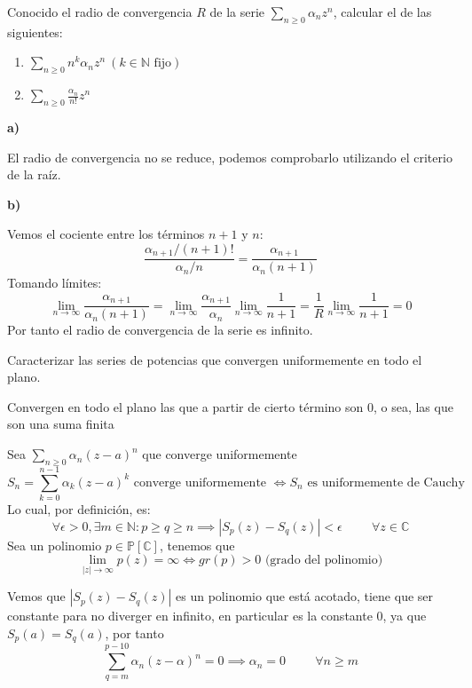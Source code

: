 \begin{ejer}
	Conocido el radio de convergencia $R$ de la serie $\sum_{n\geq 0} \alpha_nz^n$, calcular el de las siguientes:
	\begin{enumerate}[label=(\alph*)]
		\item $\sum_{n\geq 0} n^k\alpha_nz^n \ (k\in\mathbb{N} \text{ fijo})$
		\item $\sum_{n\geq0} \frac{\alpha_n}{n!}z^n$	
	\end{enumerate}
\end{ejer}
\begin{sol}

\textbf{a)}

El radio de convergencia no se reduce, podemos comprobarlo utilizando el criterio de la raíz.

\textbf{b)}

Vemos el cociente entre los términos $n+1$ y $n$:
$$ \frac{\alpha_{n+1}/(n+1)!}{\alpha_n/n} = \frac{\alpha_{n+1}}{\alpha_n (n+1)}$$
Tomando límites:
$$ \lim_{n\rightarrow\infty} \frac{\alpha_{n+1}}{\alpha_n (n+1)} = \lim_{n\rightarrow\infty}\frac{\alpha_{n+1}}{\alpha_n}\lim_{n\rightarrow\infty}\frac{1}{n+1} = \frac{1}{R} \lim_{n\rightarrow\infty}\frac{1}{n+1} = 0$$
Por tanto el radio de convergencia de la serie es infinito.
\end{sol}

\begin{ejer}
	Caracterizar las series de potencias que convergen uniformemente en todo el plano.
\end{ejer}
\begin{sol}

Convergen en todo el plano las que a partir de cierto término son 0, o sea, las que son una suma finita

Sea $\sum_{n\geq 0} \alpha_n (z-a)^n$ que converge uniformemente
$$S_n=\sum_{k=0}^{n-1} \alpha_k (z-a)^k \text{ \ converge uniformemente } \Longleftrightarrow S_n \text{ es uniformemente de Cauchy }$$
Lo cual, por definición, es:
$$\forall\epsilon>0,\exists m\in\mathbb{N}: p\geq q\geq n \implies |S_p(z)-S_q(z)| < \epsilon \hspace{1cm}\forall z\in\mathbb{C}$$
Sea un polinomio $p\in\mathbb{P}[\mathbb{C}]$, tenemos que $$\lim_{|z|\rightarrow\infty} p(z) = \infty \Longleftrightarrow gr(p)>0 \text{ (grado del polinomio)}$$

Vemos que $|S_p(z)-S_q(z)|$ es un polinomio que está acotado, tiene que ser constante para no diverger en infinito, en particular es la constante $0$, ya que $S_p(a)=S_q(a)$, por tanto $$\sum_{q=m}^{p-10} \alpha_n (z-\alpha)^n = 0 \implies  \alpha_n=0 \hspace{1cm}\forall n\geq m$$ %

\end{sol}

